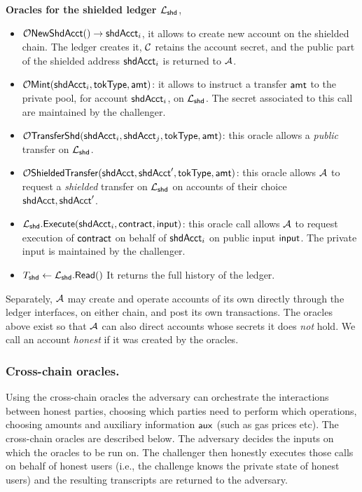  \medskip
\noindent\textbf{Oracles for the shielded ledger $\mathcal{L}_{\mathsf{shd}}$},
\begin{itemize}[leftmargin=1.4em,itemsep=3pt]
\item $\mathcal{O}\mathsf{NewShdAcct}() \to \mathsf{shdAcct}_i$, it allows to create new account on the shielded chain. The ledger
      creates it, $\mathcal{C}$ retains the account secret, and the public part of the shielded address $\mathsf{shdAcct}_i$ is returned to $\mathcal{A}$.
\item $\mathcal{O}\mathsf{Mint}(\mathsf{shdAcct}_i, \mathsf{tokType}, \mathsf{amt})$: it allows to  instruct a transfer $\mathsf{amt}$ to the private pool, for account $\mathsf{shdAcct}_i$, on $\mathcal{L}_{\mathsf{shd}}$. The secret associated to this call are maintained by the challenger.

\item $\mathcal{O}\mathsf{TransferShd}(\mathsf{shdAcct}_i, \mathsf{shdAcct}_j, \mathsf{tokType}, \mathsf{amt})$: this oracle allows a \emph{public} transfer on $\mathcal{L}_{\mathsf{shd}}$.
\item $\mathcal{O}\mathsf{ShieldedTransfer}(\mathsf{shdAcct}, \mathsf{shdAcct}', \mathsf{tokType}, \mathsf{amt})$: this oracle allows  $\mathcal{A}$ to request a \emph{shielded} transfer on $\mathcal{L}_{\mathsf{shd}}$ on accounts of their choice $\mathsf{shdAcct}, \mathsf{shdAcct}'$.

\item $\mathcal{L}_{\mathsf{shd}}.\mathsf{Execute}(\mathsf{shdAcct}_i, \mathsf{contract},  \mathsf{input})$: this oracle call allows  $\mathcal{A}$ to request execution of $\mathsf{contract}$ on behalf of  $\mathsf{shdAcct}_i$  on public input $\mathsf{input}$. The private input is maintained by the challenger.
\item $T_{\mathsf{shd}} \gets \mathcal{L}_{\mathsf{shd}}.\mathsf{Read}()$ It returns the full history of the ledger.
\end{itemize}
\medskip
\noindent Separately, $\mathcal{A}$ may create and operate accounts of its own directly through the ledger
interfaces, on either chain, and post its own transactions. The
oracles above exist so that $\mathcal{A}$ can also direct accounts whose secrets it does \emph{not} hold.
We call an account \emph{honest} if it was created by the oracles.


\subsubsection{Cross-chain oracles.}
\label{sec:crosschainoracles}
Using the cross-chain oracles the adversary can orchestrate the interactions between honest parties, choosing which parties need to perform which operations, choosing amounts and auxiliary information $\mathsf{aux}$ (such as gas prices etc).
The cross-chain oracles are described below.
The adversary decides the inputs on which the oracles to be run on.
The challenger then honestly executes  those calls on behalf of honest users (i.e., the challenge knows the private state of honest users) and the resulting transcripts are returned to the adversary.

